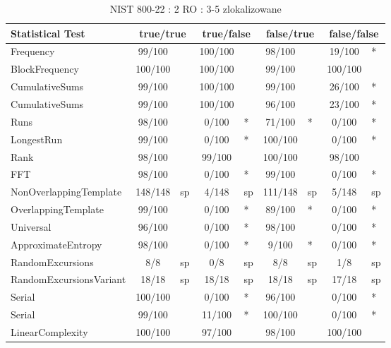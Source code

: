 \begin{table}[H]
\centering
\caption{NIST 800-22 : 2 RO : 3-5 zlokalizowane}
\label{tab:ch4_nist_22_2RO_8I_LOCALIZED}
\begin{tabular}{|l|c|l|c|l|c|l|c|l|}
\hline
\textbf{Statistical Test} & \multicolumn{2}{c|}{\textbf{true/true}} & \multicolumn{2}{c|}{\textbf{true/false}} & \multicolumn{2}{c|}{\textbf{false/true}} & \multicolumn{2}{c|}{\textbf{false/false}} \\ \hline
Frequency               &  99/100 &     & 100/100 &     &  98/100 &     &  19/100 & *   \\ \hline
BlockFrequency          & 100/100 &     & 100/100 &     &  99/100 &     & 100/100 &     \\ \hline
CumulativeSums          &  99/100 &     & 100/100 &     &  99/100 &     &  26/100 & *   \\ \hline
CumulativeSums          &  99/100 &     & 100/100 &     &  96/100 &     &  23/100 & *   \\ \hline
Runs                    &  98/100 &     &   0/100 & *   &  71/100 & *   &   0/100 & *   \\ \hline
LongestRun              &  99/100 &     &   0/100 & *   & 100/100 &     &   0/100 & *   \\ \hline
Rank                    &  98/100 &     &  99/100 &     & 100/100 &     &  98/100 &     \\ \hline
FFT                     &  98/100 &     &   0/100 & *   &  99/100 &     &   0/100 & *   \\ \hline
NonOverlappingTemplate  & 148/148 & sp  &   4/148 & sp  & 111/148 & sp  &   5/148 & sp  \\ \hline
OverlappingTemplate     &  99/100 &     &   0/100 & *   &  89/100 & *   &   0/100 & *   \\ \hline
Universal               &  96/100 &     &   0/100 & *   &  98/100 &     &   0/100 & *   \\ \hline
ApproximateEntropy      &  98/100 &     &   0/100 & *   &   9/100 & *   &   0/100 & *   \\ \hline
RandomExcursions        &     8/8 & sp  &     0/8 & sp  &     8/8 & sp  &     1/8 & sp  \\ \hline
RandomExcursionsVariant &   18/18 & sp  &   18/18 & sp  &   18/18 & sp  &   17/18 & sp  \\ \hline
Serial                  & 100/100 &     &   0/100 & *   &  96/100 &     &   0/100 & *   \\ \hline
Serial                  &  99/100 &     &  11/100 & *   & 100/100 &     &   0/100 & *   \\ \hline
LinearComplexity        & 100/100 &     &  97/100 &     &  98/100 &     & 100/100 &     \\ \hline
\end{tabular}
\end{table}




